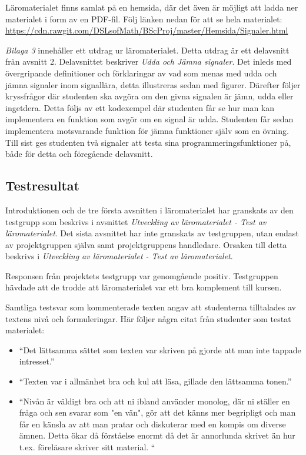 \documentclass[]{article}
\begin{document}
Läromaterialet finns samlat på en hemsida, där det även är möjligt att ladda ner materialet i form av en PDF-fil. Följ 
länken nedan för att se hela materialet:
\url{https://cdn.rawgit.com/DSLsofMath/BScProj/master/Hemsida/Signaler.html}

\textit{Bilaga 3} innehåller ett utdrag ur läromaterialet. Detta utdrag är ett delavsnitt från avsnitt 2. Delavsnittet 
beskriver \textit{Udda och Jämna signaler}. Det inleds med övergripande definitioner och förklaringar av vad som menas med udda 
och jämna signaler inom signallära, detta illustreras sedan med figurer. Därefter följer kryssfrågor där studenten ska 
avgöra om den givna signalen är jämn, udda eller ingetdera. Detta följs av ett kodexempel där studenten får se hur man 
kan implementera en funktion som avgör om en signal är udda. Studenten får sedan implementera motsvarande funktion för 
jämna funktioner själv som en övning. Till sist ges studenten två signaler att testa sina programmeringsfunktioner på, 
både för detta och föregående delavsnitt.


\subsection{Testresultat}
Introduktionen och de tre första avsnitten i läromaterialet har granskats av den testgrupp som beskrivs i avsnittet 
\textit{Utveckling av läromaterialet - Test av läromaterialet}. Det sista avsnittet har inte granskats av testgruppen, 
utan endast av projektgruppen själva samt projektgruppens handledare. Orsaken till detta beskrivs i 
\textit{Utveckling av läromaterialet - Test av läromaterialet}.

Responsen från projektets testgrupp var genomgående positiv. Testgruppen hävdade att de trodde att läromaterialet var 
ett bra komplement till kursen. 

Samtliga testsvar som kommenterade texten angav att studenterna tilltalades av textens nivå och formuleringar. Här 
följer några citat från studenter som testat materialet:
\begin{itemize}
  \item “Det lättsamma sättet som texten var skriven på gjorde att man inte tappade intresset.”
  \item “Texten var i allmänhet bra och kul att läsa, gillade den lättsamma tonen.”
  \item “Nivån är väldigt bra och att ni ibland använder monolog, där ni ställer en fråga och sen svarar som "en vän",
  gör att det känns mer begripligt och man får en känsla av att man pratar och diskuterar med en kompis om diverse ämnen.
  Detta ökar då förståelse enormt då det är annorlunda skrivet än hur t.ex. föreläsare skriver sitt material. “
\end{itemize}
\end{document}
